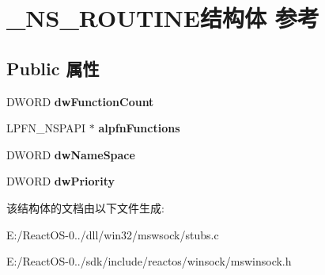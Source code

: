 \hypertarget{struct___n_s___r_o_u_t_i_n_e}{}\section{\+\_\+\+N\+S\+\_\+\+R\+O\+U\+T\+I\+N\+E结构体 参考}
\label{struct___n_s___r_o_u_t_i_n_e}
\subsection*{Public 属性}
\begin{DoxyCompactItemize}
\item 
\mbox{\label{struct___n_s___r_o_u_t_i_n_e_aa831275db6efab6dd74fd3027b21d803}} 
D\+W\+O\+RD {\bfseries dw\+Function\+Count}
\item 
\mbox{\label{struct___n_s___r_o_u_t_i_n_e_a11cb4b3d310d13afdbd9a6292450e0ae}} 
L\+P\+F\+N\+\_\+\+N\+S\+P\+A\+PI $\ast$ {\bfseries alpfn\+Functions}
\item 
\mbox{\label{struct___n_s___r_o_u_t_i_n_e_ab2bbb5550b22db51db9d4e825d066d66}} 
D\+W\+O\+RD {\bfseries dw\+Name\+Space}
\item 
\mbox{\label{struct___n_s___r_o_u_t_i_n_e_aeb53b31e01ae082896a2ef8cda5c3a87}} 
D\+W\+O\+RD {\bfseries dw\+Priority}
\end{DoxyCompactItemize}


该结构体的文档由以下文件生成\+:\begin{DoxyCompactItemize}
\item 
E\+:/\+React\+O\+S-\/0../dll/win32/mswsock/stubs.\+c\item 
E\+:/\+React\+O\+S-\/0../sdk/include/reactos/winsock/mswinsock.\+h\end{DoxyCompactItemize}
